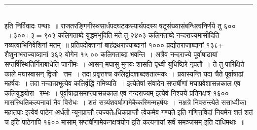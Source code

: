 \documentclass[11pt, openany]{book}
\makeatletter
\newcommand{\devanagarinumeral}[1]{
\devanagaridigits{\number \csname c@#1\endcsname}} %
\makeatother
\begin{document}
\begin{multicols}{2}
\noindent
\rule{1\linewidth}{0.5pt}\\

\noindent
इति निर्विवादः पन्थाः~॥ राजतरङ्गिगीस्थसार्धपदघटकस्यार्थपदस्य षटूसंख्यासंबन्धित्वनिर्णये तु ६०० \textendash\ +३००+३$=$९०३ कलिगताब्दे युद्धमभूदिति मते तु २४०३ कलिगताब्दे नन्दराज्यमासीदिति नव्यत्वाभिनिवेशिनां मतम्~॥ प्रतिपदोक्तानां बाहंद्रथराज्याब्दानां १००० प्रद्योतराजाब्दानां १३८+ शैशुनाभराज्याव्दानां ३६२ योगेन १५ ०० कलिगताब्दा भवन्ति~। अत्रैव नन्दराज्ये पूर्वाषाढायां सप्तर्षिस्थितिर्निराबाधेति जानीमः~। {\qt आसन् मघासु मुनयः शासति पृथ्वीं युधिष्ठिरे नृपतौ}~। ते तु पारिक्षिते काले मघास्वासन् द्विजो \textendash\ त्तम~। तदा प्रवृत्तश्च कलिर्द्वादशाब्दशतात्मकः~। प्रयास्यन्ति यदा चैते पूर्वाषाढां महर्षयः~। तदा नन्दात्प्रभूत्येव कलिर्वृद्धिं गमिष्यति~। इत्येतेषां संवादेन सप्तर्षीणां मघाप्रवेशासन्नकाल एव कलियुद्धयोरा \textendash\ रम्भः~। पूर्वाषाढासमाप्त्यासन्नकाल एव नन्दराज्यम् इत्येवं निश्चये प्रतिनक्षत्रं १६०० मासस्थितिकल्पनायां नैव विरोधः~। शतं सत्र्यंशवर्षाणामेकैकस्मिन्महर्षयः~। नक्षत्रे निवसन्त्येते ससाध्वीका महातपाः इत्येवं पाठेन अर्धतो न्यूनप्राप्तौ त्यज्यतेsधिकप्राप्तौ त्वेकमेव गण्यते इति गणित्तविदां नियमेन शतं शतं च इति पाठेनापि १६०० मासाम् सप्तर्षीणामेकनक्षत्रयोग इति कल्पनायां सर्वं समञ्जसम् इति दाधिमथाः~॥
\end{multicols}

\fancyhead[RO,LE]{\thepage}
\cfoot{}
\newpage
\renewcommand{\thepage}{\devanagarinumeral{page}}
\setcounter{page}{9}

\end{document}
